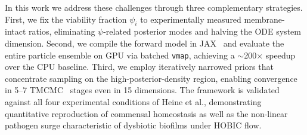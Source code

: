 \documentclass[11pt,a4paper]{article}
\begin{document}
In this work we address these challenges through three complementary strategies.
First, we fix the viability fraction $\psi_i$ to experimentally measured membrane-intact ratios, eliminating $\psi$-related posterior modes and halving the ODE system dimension.
Second, we compile the forward model in JAX~\cite{jax2018github} and evaluate the entire particle ensemble on GPU via batched \texttt{vmap}, achieving a $\sim$200$\times$ speedup over the CPU baseline.
Third, we employ iteratively narrowed priors that concentrate sampling on the high-posterior-density region, enabling convergence in 5--7 TMCMC~\cite{ChingChen2007TMCMC, Betz2016TMCMC} stages even in 15 dimensions.
The framework is validated against all four experimental conditions of Heine et al., demonstrating quantitative reproduction of commensal homeostasis as well as the non-linear pathogen surge characteristic of dysbiotic biofilms under HOBIC flow.
\end{document}
